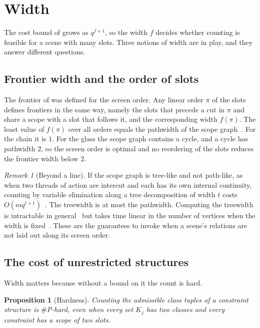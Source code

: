 \documentclass[11pt,twoside,openright]{book}
\theoremstyle{plain}
\newtheorem{proposition}[theorem]{Proposition}
\theoremstyle{definition}
\theoremstyle{remark}
\newtheorem{remark}[theorem]{Remark}
\begin{document}
\section{Width}\label{sec:width}

The cost bound of  grows as $q^{f+1}$, so the width $f$ decides whether counting is feasible for a scene with many slots. Three notions of width are in play, and they answer different questions.

\subsection{Frontier width and the order of slots}

The frontier of  was defined for the screen order. Any linear order $\pi$ of the slots defines frontiers in the same way, namely the slots that precede a cut in $\pi$ and share a scope with a slot that follows it, and the corresponding width $f(\pi)$. The least value of $f(\pi)$ over all orders equals the pathwidth of the scope graph~\cite{kinnersley1992}. For the chain it is $1$. For the glass the scope graph contains a cycle, and a cycle has pathwidth $2$, so the screen order is optimal and no reordering of the slots reduces the frontier width below $2$.

\begin{remark}[Beyond a line]\label{rem:tree}
If the scope graph is tree-like and not path-like, as when two threads of action are intercut and each has its own internal continuity, counting by variable elimination along a tree decomposition of width $t$ costs $O(mq^{t+1})$~\cite{dechter1999,robertsonseymour1984}. The treewidth is at most the pathwidth. Computing the treewidth is intractable in general~\cite{arnborg1987} but takes time linear in the number of vertices when the width is fixed~\cite{bodlaender1996}. These are the guarantees to invoke when a scene's relations are not laid out along its screen order.
\end{remark}

\subsection{The cost of unrestricted structures}

Width matters because without a bound on it the count is hard.

\begin{proposition}[Hardness]\label{prop:hard}
Counting the admissible class tuples of a constraint structure is $\#$P-hard, even when every set $K_j$ has two classes and every constraint has a scope of two slots.
\end{proposition}
\end{document}
